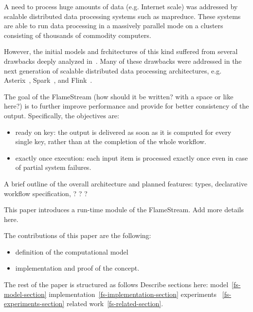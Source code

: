 
\label {fs-intro-seciton}

A need to process huge amounts of data (e.g. Internet scale) was addressed by scalable distributed data processing systems such as  mapreduce. These systems are able to run data processing in a massively parallel mode on a clusters consisting of thousands of commodity computers. 

However, the initial models and frchitectures of this kind suffered from several drawbacks deeply analyzed in~\cite{Doulkeridis:2014:SLA:2628707.2628782,}. Many of these drawbacks were addressed in the next generation of scalable distributed data processing architectures, e.g. 
Asterix~\cite{Alsubaiee:2012:ASW:2331801.2331803}, 
Spark~\cite{Zaharia:2016:ASU:3013530.2934664,Franklin:2015:MSB:2684822.2685326}, 
and Flink~\cite{Carbone:2017:SMA:3137765.3137777}. 

The goal of the FlameStream (how should it be written? with a space or like here?) is to further improve performance and provide for better consistency of the output.  Specifically, the objectives are:

\begin {itemize}
\item ready on key: the output is delivered as soon as it is computed for every single key, rather than at the completion of  the whole workflow.
\item exactly once execution: each input item is processed exactly once even in case of partial system failures. 
\end {itemize}

A brief outline of the overall architecture and planned features: types, declarative workflow specification, ? ? ?

This paper introduces a run-time module of the  FlameStream. 
Add more details here.

The contributions of this paper are the following:

\begin {itemize}
\item definition of the computational model
\item implementation and proof of the concept.
\end {itemize}

The rest of the paper is structured as follows 
Describe sections here: model~\ref {fs-model-section}
implementation~\ref{fs-implementation-section}
experiments ~\ref{fs-experiments-section}
related work~\ref{fs-related-section}.


\endinput
